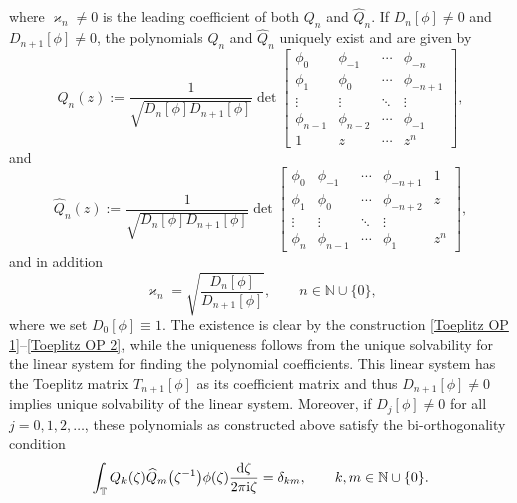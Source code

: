 \documentclass[pdftex]{sigma}
\numberwithin{equation}{section}
\newcommand{\N}{{\mathbb N}}
\newcommand{\T}{{\mathbb T}}
\newcommand{\de}{\delta}
\newcommand{\ze}{\zeta}
\newcommand{\ii}{{\rm i}}
\newcommand{\dd}{{\rm d}}
\begin{document}
	where $\varkappa_n \neq 0$ is the leading coefficient of both $Q_n$ and $\widehat{Q}_n$. If $D_n[\phi] \neq 0$ and $D_{n+1}[\phi] \neq 0$, the polynomials $Q_n$ and $\widehat{Q}_n$ uniquely exist and are given by
	\begin{equation}\label{Toeplitz OP 1}
		Q_n(z):= \frac{1}{\sqrt{D_n[\phi] D_{n+1}[\phi]}} \det \begin{bmatrix}
			\phi_0 & \phi_{-1} & \cdots & \phi_{-n} \\
			\phi_1 & \phi_{0} & \cdots & \phi_{-n+1} \\
			\vdots & \vdots & \ddots & \vdots \\
			\phi_{n-1} & \phi_{n-2} & \cdots & \phi_{-1} \\
			1 & z & \cdots & z^n
		\end{bmatrix},
	\end{equation}
	and
	\begin{equation}\label{Toeplitz OP 2}
		\widehat{Q}_n(z) := \frac{1}{\sqrt{D_n[\phi] D_{n+1}[\phi]}} \det \begin{bmatrix}
			\phi_0 & \phi_{-1} & \cdots & \phi_{-n+1} & 1 \\
			\phi_1 & \phi_{0} & \cdots & \phi_{-n+2} & z \\
			\vdots & \vdots & \ddots & \vdots \\
			\phi_{n} & \phi_{n-1} & \cdots & \phi_{1} & z^n
		\end{bmatrix},
	\end{equation}
	and in addition
	\begin{equation}\label{varkappa}
		\varkappa_n = \sqrt{\frac{D_{n}[\phi]}{D_{n+1}[\phi]}}, \qquad n \in \N \cup \{0\},
	\end{equation}
	where we set $D_0[\phi] \equiv 1$. The existence is clear by the construction \eqref{Toeplitz OP 1}--\eqref{Toeplitz OP 2}, while the uniqueness follows from the unique solvability for the linear system for finding the polynomial coefficients. This linear system has the Toeplitz matrix $T_{n+1}[\phi]$ as its coefficient matrix and thus $D_{n+1}[\phi]\neq 0$ implies unique solvability of the linear system. Moreover, if $D_j[\phi] \neq 0$ for all~${j=0,1,2, \ldots}$, these polynomials as constructed above satisfy the bi-orthogonality condition
	\begin{equation}\label{biorthogonality}
		\int_{\T} Q_k(\ze)\widehat{Q}_m\big(\ze^{-1}\big)\phi(\ze)\frac{\dd \ze}{2\pi \ii \ze}= \de_{km}, \qquad k,m \in \N \cup \{0\}.
	\end{equation}
	
\end{document}

